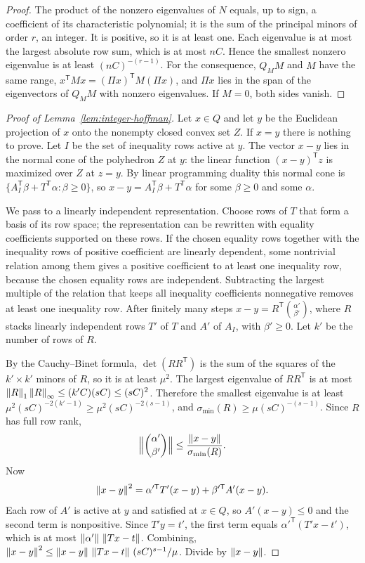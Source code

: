 \begin{proof}
The product of the nonzero eigenvalues of $N$ equals, up to sign, a
coefficient of its characteristic polynomial; it is the sum of the
principal minors of order $r$, an integer. It is positive, so it is at
least one. Each eigenvalue is at most the largest absolute row sum, which
is at most $nC$. Hence the smallest nonzero eigenvalue is at least
$(nC)^{-(r-1)}$. For the consequence, $Q_MM$ and $M$ have the same range,
$x^{\mathsf T}Mx=(\Pi x)^{\mathsf T}M(\Pi x)$, and $\Pi x$ lies in the
span of the eigenvectors of $Q_MM$ with nonzero eigenvalues. If $M=0$,
both sides vanish.
\end{proof}

\begin{proof}[Proof of Lemma~\ref{lem:integer-hoffman}]
Let $x\in Q$ and let $y$ be the Euclidean projection of $x$ onto the
nonempty closed convex set $Z$. If $x=y$ there is nothing to prove. Let
$I$ be the set of inequality rows active at $y$. The vector $x-y$ lies in
the normal cone of the polyhedron $Z$ at $y$: the linear function
$(x-y)^{\mathsf T}z$ is maximized over $Z$ at $z=y$. By linear programming
duality this normal cone is
$\{A_I^{\mathsf T}\beta+T^{\mathsf T}\alpha:\beta\ge0\}$, so
$x-y=A_I^{\mathsf T}\beta+T^{\mathsf T}\alpha$ for some $\beta\ge0$ and some
$\alpha$.

We pass to a linearly independent representation. Choose rows of $T$ that
form a basis of its row space; the representation can be rewritten with
equality coefficients supported on these rows. If the chosen equality rows
together with the inequality rows of positive coefficient are linearly
dependent, some nontrivial relation among them gives a positive coefficient
to at least one inequality row, because the chosen equality rows are
independent. Subtracting the largest multiple of the relation that keeps
all inequality coefficients nonnegative removes at least one inequality
row. After finitely many steps
$x-y=R^{\mathsf T}\binom{\alpha'}{\beta'}$, where $R$ stacks linearly
independent rows $T'$ of $T$ and $A'$ of $A_I$, with $\beta'\ge0$. Let $k'$
be the number of rows of $R$.

By the Cauchy--Binet formula, $\det(RR^{\mathsf T})$ is the sum of the
squares of the $k'\times k'$ minors of $R$, so it is at least $\mu^2$. The
largest eigenvalue of $RR^{\mathsf T}$ is at most
$\left\lVert R\right\rVert_1\left\lVert R\right\rVert_\infty\le(k'C)(sC)\le(sC)^2$. Therefore the smallest
eigenvalue is at least $\mu^2(sC)^{-2(k'-1)}\ge\mu^2(sC)^{-2(s-1)}$, and
$\sigma_{\min}(R)\ge\mu(sC)^{-(s-1)}$. Since $R$ has full row rank,
\[
 \Bigl\|\binom{\alpha'}{\beta'}\Bigr\|\le\frac{\left\lVert x-y\right\rVert}{\sigma_{\min}(R)}.
\]
Now
\[
 \left\lVert x-y\right\rVert^2=\alpha'^{\mathsf T}T'(x-y)+\beta'^{\mathsf T}A'(x-y).
\]
Each row of $A'$ is active at $y$ and satisfied at $x\in Q$, so
$A'(x-y)\le0$ and the second term is nonpositive. Since $T'y=t'$, the first
term equals $\alpha'^{\mathsf T}(T'x-t')$, which is at most
$\left\lVert\alpha'\right\rVert\,\left\lVert Tx-t\right\rVert$. Combining,
$\left\lVert x-y\right\rVert^2\le\left\lVert x-y\right\rVert\,\left\lVert Tx-t\right\rVert\,(sC)^{s-1}/\mu$. Divide by
$\left\lVert x-y\right\rVert$.


\end{proof}
